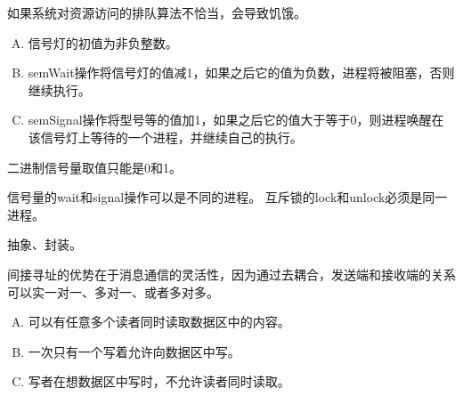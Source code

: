 {    %
    \begin{reviewc}
        如果系统对资源访问的排队算法不恰当，会导致饥饿。
    \end{reviewc}

    \begin{reviewc}
        \begin{enumerate}[A.]
            \item 信号灯的初值为非负整数。
            \item semWait操作将信号灯的值减1，如果之后它的值为负数，进程将被阻塞，否则继续执行。
            \item semSignal操作将型号等的值加1，如果之后它的值大于等于0，则进程唤醒在该信号灯上等待的一个进程，并继续自己的执行。
        \end{enumerate}
    \end{reviewc}

    \begin{reviewc}
        二进制信号量取值只能是0和1。
    \end{reviewc}

    \begin{reviewc}
        信号量的wait和signal操作可以是不同的进程。
        互斥锁的lock和unlock必须是同一进程。
    \end{reviewc}

    \begin{reviewc}
        抽象、封装。
    \end{reviewc}

    \begin{reviewc}
        间接寻址的优势在于消息通信的灵活性，因为通过去耦合，发送端和接收端的关系可以实一对一、多对一、或者多对多。
    \end{reviewc}

    \begin{reviewc}
        \begin{enumerate}[A.]
            \item 可以有任意多个读者同时读取数据区中的内容。
            \item 一次只有一个写着允许向数据区中写。
            \item 写者在想数据区中写时，不允许读者同时读取。
        \end{enumerate}
    \end{reviewc}
}
